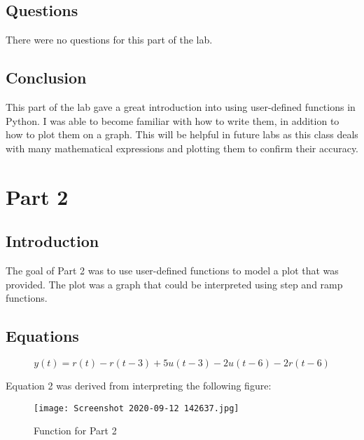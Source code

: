 \documentclass[12pt, titlepage]{article}
\begin{document}
            \subsection{Questions}
            There were no questions for this part of the lab.
            
            \subsection{Conclusion}
            This part of the lab gave a great introduction into using user-defined functions in Python.  I was able to become familiar with how to write them, in addition to how to plot them on a graph.  This will be helpful in future labs as this class deals with many mathematical expressions and plotting them to confirm their accuracy.
            
        \newpage
        \section{Part 2}
            \subsection{Introduction}
            The goal of Part 2 was to use user-defined functions to model a plot that was provided.  The plot was a graph that could be interpreted using step and ramp functions.
            
            \subsection{Equations}
            
            \begin{equation}
                y(t)=r(t)-r(t-3)+5u(t-3)-2u(t-6)-2r(t-6)
            \end{equation}
            
            Equation 2 was derived from interpreting the following figure:
            
            \begin{figure}[h!]
                \centering
                \texttt{[image: Screenshot 2020-09-12 142637.jpg]}
                \caption{Function for Part 2}
                \label{fig:my_label}
            \end{figure}
            
\end{document}
